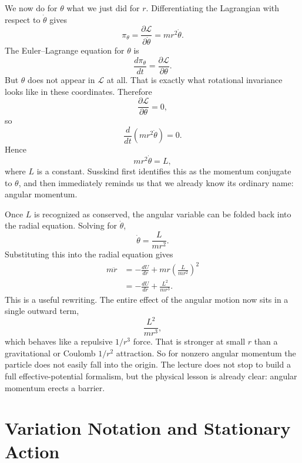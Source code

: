 We now do for \(\theta\) what we just did for \(r\). Differentiating the Lagrangian with respect to \(\dot\theta\) gives
\begin{equation}
\pi_\theta=\frac{\partial \mathcal{L}}{\partial \dot\theta}=mr^2\dot\theta.
\end{equation}
The Euler--Lagrange equation for \(\theta\) is
\begin{equation}
\frac{d\pi_\theta}{dt}=\frac{\partial \mathcal{L}}{\partial \theta}.
\end{equation}
But \(\theta\) does not appear in \(\mathcal{L}\) at all. That is exactly what rotational invariance looks like in these coordinates. Therefore
\begin{equation}
\frac{\partial \mathcal{L}}{\partial \theta}=0,
\end{equation}
so
\begin{equation}
\frac{d}{dt}\left(mr^2\dot\theta\right)=0.
\end{equation}
Hence
\begin{equation}
mr^2\dot\theta=L,
\end{equation}
where \(L\) is a constant. Susskind first identifies this as the momentum conjugate to \(\theta\), and then immediately reminds us that we already know its ordinary name: angular momentum.

Once \(L\) is recognized as conserved, the angular variable can be folded back into the radial equation. Solving for \(\dot\theta\),
\begin{equation}
\dot\theta=\frac{L}{mr^2}.
\end{equation}
Substituting this into the radial equation gives
\begin{align}
m\ddot r
&=-\frac{dU}{dr}+mr\left(\frac{L}{mr^2}\right)^2 \\
&=-\frac{dU}{dr}+\frac{L^2}{mr^3}.
\end{align}
This is a useful rewriting. The entire effect of the angular motion now sits in a single outward term,
\begin{equation}
\frac{L^2}{mr^3},
\end{equation}
which behaves like a repulsive \(1/r^3\) force. That is stronger at small \(r\) than a gravitational or Coulomb \(1/r^2\) attraction. So for nonzero angular momentum the particle does not easily fall into the origin. The lecture does not stop to build a full effective-potential formalism, but the physical lesson is already clear: angular momentum erects a barrier.

\section{Variation Notation and Stationary Action}

